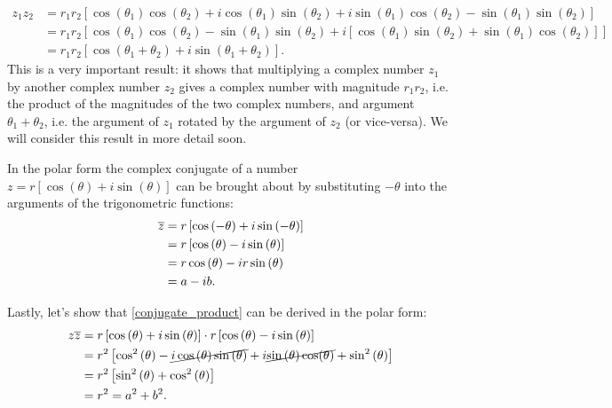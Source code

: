 \begin{align}
	z_{1}z_{2} &= r_{1}r_{2}\left[ \cos\left( \theta_{1} \right)\cos\left( \theta_{2} \right) + i\cos\left( \theta_{1} \right)\sin\left( \theta_{2} \right) + i\sin\left( \theta_{1} \right)\cos\left( \theta_{2} \right) -\sin\left( \theta_{1} \right)\sin\left( \theta_{2} \right) \right]\nonumber\\
	&= r_{1}r_{2}\left[ \cos\left( \theta_{1} \right)\cos\left( \theta_{2} \right)-\sin\left( \theta_{1} \right)\sin\left( \theta_{2} \right) + i\left[ \cos\left( \theta_{1} \right)\sin\left( \theta_{2} \right) + \sin\left( \theta_{1} \right)\cos\left( \theta_{2} \right) \right] \right]\nonumber\\
	&= r_{1}r_{2}\left[ \cos\left( \theta_{1}+\theta_{2} \right) + i\sin\left( \theta_{1}+\theta_{2} \right)  \right].
	\label{eq:complex_product_geometric_insight}
\end{align}
This is a very important result: it shows that multiplying a complex number $z_{1}$ by another complex number $z_{2}$ gives a complex number with magnitude $r_{1}r_{2}$, i.e. the product of the magnitudes of the two complex numbers, and argument $\theta_{1}+\theta_{2}$, i.e. the argument of $z_{1}$ rotated by the argument of $z_{2}$ (or vice-versa). We will consider this result in more detail soon.


In the polar form the complex conjugate of a number $z=r\left[ \cos\left( \theta \right) +i\sin\left( \theta \right) \right]$ can be brought about by substituting $-\theta$ into the arguments of the trigonometric functions:
\begin{align}
	\overline{z} &= r\left[ \cos\left( -\theta \right) + i\sin\left( -\theta \right) \right]\nonumber\\
	&= r\left[ \cos\left( \theta \right) - i\sin\left( \theta \right) \right]\nonumber\\
	&= r\cos\left( \theta \right) - ir\sin\left( \theta \right)\nonumber\\
	&= a-ib.
	\label{eq:complex_conjugation_geometric}
\end{align}

Lastly, let's show that \eqref{conjugate_product} can be derived in the polar form:
\begin{align}
	z\overline{z} &= r\left[ \cos\left( \theta \right) + i\sin\left( \theta \right) \right] \cdot r\left[ \cos\left( \theta \right) - i\sin\left( \theta \right) \right]\nonumber\\
	&= r^{2}\left[ \cos^{2}\left( \theta \right) -\cancel{i\cos\left( \theta \right)\sin\left( \theta \right)} +i\cancel{\sin\left( \theta \right)\cos(\theta)} + \sin^{2}\left( \theta \right) \right]\nonumber\\
	&= r^{2}\left[ \sin^{2}\left( \theta \right) + \cos^{2}\left( \theta \right) \right]\nonumber\\
	&= r^{2} = a^{2}+b^{2}.
	\label{eq:conjugate_product_geometric}
\end{align}

